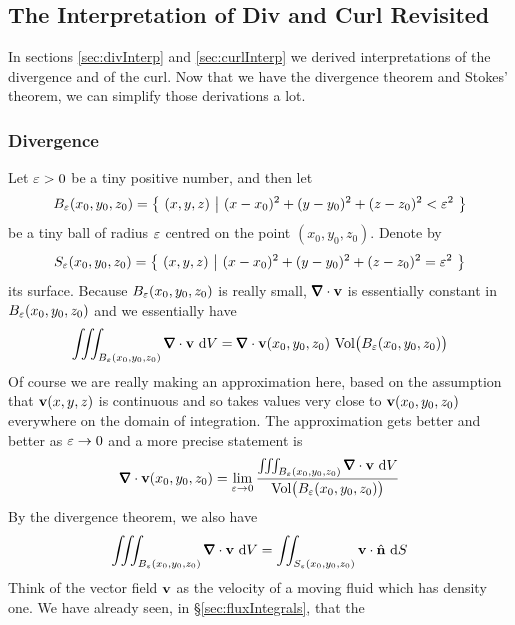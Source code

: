 \subsection{The Interpretation of Div and Curl Revisited}  \label{sec:interpBis}

In sections \ref{sec:divInterp} and \ref{sec:curlInterp} we derived
interpretations of the divergence and of the curl. Now that we have the 
divergence theorem and Stokes' theorem, we can simplify those derivations 
a lot. 


\subsubsection{Divergence}
Let $\varepsilon>0$ be a tiny positive number, and then
let 
\begin{equation*}
B_\varepsilon(x_0,y_0,z_0) =\big\{ \ (x,y,z)\ \big|\ (x-x_0)^2+(y-y_0)^2+(z-z_0)^2<\varepsilon^2\ \big\}
\end{equation*}
be a tiny ball of radius $\varepsilon$
centred on the point $(x_0,y_0,z_0)$.
Denote by 
\begin{equation*}
S_\varepsilon(x_0,y_0,z_0) =\big\{ \ (x,y,z)\ \big|\ (x-x_0)^2+(y-y_0)^2+(z-z_0)^2=\varepsilon^2\ \big\}
\end{equation*}
its surface. Because 
$B_\varepsilon(x_0,y_0,z_0)$ is really small, $\vnabla\cdot \vv$ is essentially
constant in $B_\varepsilon(x_0,y_0,z_0)$ and we 
essentially have
\begin{equation*}
\tripInt_{B_\veps(x_0,y_0,z_0)} \vnabla\cdot \vv\ \dee{V}
=\vnabla\cdot \vv(x_0,y_0,z_0)\ \text{Vol}\big(B_\veps(x_0,y_0,z_0)\big)
\end{equation*}
Of course we are really making an approximation 
here, based on the assumption that $\mathbf{v}(x,y,z)$ is continuous and so 
takes values very close to $\mathbf{v}(x_0,y_0,z_0)$ everywhere on the 
domain of integration. The approximation gets better and better as $\varepsilon\rightarrow 0$ and a more precise statement is
\begin{equation*}
\vnabla\cdot\vv(x_0,y_0,z_0)=\lim_{\veps\rightarrow 0}
\frac{\tripInt_{B_\veps(x_0,y_0,z_0)} \vnabla\cdot \vv\ \dee{V}}
       {\text{Vol}\big(B_\veps(x_0,y_0,z_0)\big)}
\end{equation*}
By the divergence theorem, we also have
\begin{equation*}
\tripInt_{B_\veps(x_0,y_0,z_0)} \vnabla\cdot \vv\ \dee{V}
=\dblInt_{S_\veps(x_0,y_0,z_0)} \vv\cdot\hn \ \dee{S}
\end{equation*}
Think of the vector field $\mathbf{v}$ as the velocity of a moving fluid which
has density one. We have already seen, in \S\ref{sec:fluxIntegrals}, that the 

